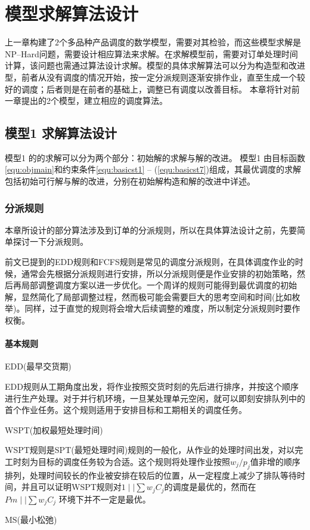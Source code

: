\newcommand{\jobunit}[1]{*+[F]{\makebox[1.5em]{$#1$}}}
\newcommand{\process}[1]{*++=[o][F]{\makebox[2em]{$#1$}}}
\theoremheaderfont{\heiti}
\newtheorem{algori}[algor]{算法}%
\chapter{模型求解算法设计}
上一章构建了$2$个多品种产品调度的数学模型，需要对其检验，而这些模型求解是NP--Hard问题，需要设计相应算法来求解。在求解模型前，需要对订单处理时间计算，该问题也需通过算法设计求解。模型的具体求解算法可以分为构造型和改进型，前者从没有调度的情况开始，按一定分派规则逐渐安排作业，直至生成一个较好的调度；后者则是在前者的基础上，调整已有调度以改善目标。
本章将针对前一章提出的2个模型，建立相应的调度算法。


\section{模型1 求解算法设计}
模型1 的的求解可以分为两个部分：初始解的求解与解的改进。
模型1 由目标函数\eqref{equ:objmain}和约束条件\eqref{equ:basicst1} -- (\ref{equ:basicst7})组成，其最优调度的求解包括初始可行解与解的改进，分别在初始解构造和解的改进中详述。

\subsection{分派规则}
本章所设计的部分算法涉及到订单的分派规则，所以在具体算法设计之前，先要简单探讨一下分派规则。

前文已提到的EDD规则和FCFS规则是常见的调度分派规则，在具体调度作业的时候，通常会先根据分派规则进行安排，所以分派规则便是作业安排的初始策略，然后再局部调整调度方案以进一步优化。一个周详的规则可能得到最优调度的初始解，显然简化了局部调整过程，然而极可能会需要巨大的思考空间和时间(比如枚举)。同样，过于直觉的规则将会增大后续调整的难度，所以制定分派规则时要作权衡。
\subsubsection{基本规则}
\begin{asparaenum}
\item EDD(最早交货期)

EDD规则从工期角度出发，将作业按照交货时刻的先后进行排序，并按这个顺序进行生产处理。对于并行机环境，一旦某处理单元空闲，就可以即刻安排队列中的首个作业任务。这个规则适用于安排目标和工期相关的调度任务。
\item WSPT(加权最短处理时间)

WSPT规则是SPT(最短处理时间)规则的一般化，从作业的处理时间出发，对以完工时刻为目标的调度任务较为合适。这个规则将处理作业按照$w_j/p_j$值非增的顺序排列，处理时间较长的作业被安排在较后的位置，从一定程度上减少了排队等待时间，并且可以证明WSPT规则对$1\mid \mid \sum w_jC_j$的调度是最优的\cite{pinedo}，然而在$Pm \mid \mid \sum w_jC_j$ 环境下并不一定是最优。

\item MS(最小松弛)
\end{asparaenum}

